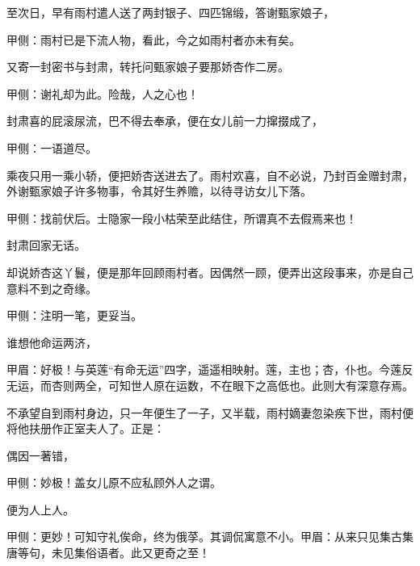 \begin{parag}
    至次日，早有雨村遣人送了两封银子、四匹锦缎，答谢甄家娘子，\begin{note}甲侧：雨村已是下流人物，看此，今之如雨村者亦未有矣。\end{note}又寄一封密书与封肃，转托问甄家娘子要那娇杏作二房。\begin{note}甲侧：谢礼却为此。险哉，人之心也！\end{note}封肃喜的屁滚尿流，巴不得去奉承，便在女儿前一力撺掇成了，\begin{note}甲侧：一语道尽。\end{note}乘夜只用一乘小轿，便把娇杏送进去了。雨村欢喜，自不必说，乃封百金赠封肃，外谢甄家娘子许多物事，令其好生养赡，以待寻访女儿下落。\begin{note}甲侧：找前伏后。士隐家一段小枯荣至此结住，所谓真不去假焉来也！\end{note}封肃回家无话。
\end{parag}


\begin{parag}
    却说娇杏这丫鬟，便是那年回顾雨村者。因偶然一顾，便弄出这段事来，亦是自己意料不到之奇缘。\begin{note}甲侧：注明一笔，更妥当。\end{note}谁想他命运两济，\begin{note}甲眉：好极！与英莲“有命无运”四字，遥遥相映射。莲，主也；杏，仆也。今莲反无运，而杏则两全，可知世人原在运数，不在眼下之高低也。此则大有深意存焉。\end{note}不承望自到雨村身边，只一年便生了一子，又半载，雨村嫡妻忽染疾下世，雨村便将他扶册作正室夫人了。正是：
\end{parag}


\begin{poem}
    \begin{pl}偶因一著错，\end{pl}\begin{note}甲侧：妙极！盖女儿原不应私顾外人之谓。\end{note}

    \begin{pl}便为人上人。\end{pl}\begin{note}甲侧：更妙！可知守礼俟命，终为俄莩。其调侃寓意不小。甲眉：从来只见集古集唐等句，未见集俗语者。此又更奇之至！\end{note}

\end{poem}


